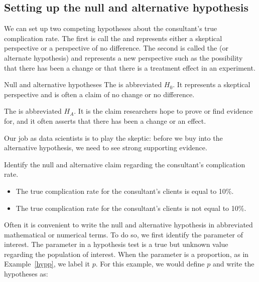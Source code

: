 \subsection{Setting up the null and alternative hypothesis}

We can set up two competing hypotheses about the consultant's true complication rate. The first is call the  and represents either a skeptical perspective or a perspective of no difference. The second is called the  (or alternate hypothesis) and represents a new perspective such as the possibility that there has been a change or that there is a treatment effect in an experiment.

\begin{onebox}{Null and alternative hypotheses}
The  is abbreviated $H_0$. It represents a skeptical perspective and is often a claim of no change or no difference. \vspace{3mm}

The  is abbreviated $H_A$. It is the claim researchers hope to prove or find evidence for, and it often asserts that there has been a change or an effect. \vspace{3mm}

Our job as data scientists is to play the skeptic: before we buy into the alternative hypothesis, we need to see strong supporting evidence.
\end{onebox}

\begin{examplewrap}\begin{nexample}{Identify the null and alternative claim regarding the consultant's complication rate.}
\label{complication}
\begin{itemize}
\item[$H_0$:] The true complication rate for the consultant's clients is equal to 10\%.
\item[$H_A$:] The true complication rate for the consultant's clients is not equal to 10\%.  
\end{itemize}
\label{hypp}
\end{nexample}\end{examplewrap}

Often it is convenient to write the null and alternative hypothesis in abbreviated mathematical or numerical terms. To do so, we first identify the parameter of interest. The parameter in a hypothesis test is a true but unknown value regarding the population of interest.  When the parameter is a proportion, as in Example~\ref{hypp}, we label it $p$. For this example, we would define $p$ and write the hypotheses as:

